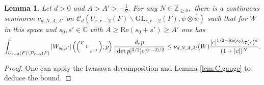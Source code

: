 \documentclass[12pt]{amsart}
\newtheorem{cor}[thm]{Corollary}
\newtheorem{lem}[thm]{Lemma}
\theoremstyle{remark}
\numberwithin{equation}{section}
\newcommand{\GL}{\mathrm{GL}}
\newcommand{\ZZ}{\mathbb{Z}}
\newcommand{\lto}{\longrightarrow}
\newcommand{\CC}{\mathbb{C}}
\newcommand{\quash}[1]{}
\theoremstyle{definition}
\newenvironment{psmatrix}
  {\left(\begin{smallmatrix}}
  {\end{smallmatrix}\right)}
\numberwithin{equation}{subsection}
\begin{document}
\begin{lem} \label{lem:for:zeta}
Let $d>0$ and $A>A'>-\tfrac{1}{2}.$ For any  $N \in \ZZ_{ \geq 0},$ there is a continuous seminorm $\nu_{d,N,A,A'}$ on  
$\mathcal{C}_{d}(U_{r,r-2}(F) \backslash \GL_{r,r-2}(F),\psi \otimes \overline{\psi})
$
such that for $W$ in this space and $s_0,s' \in \CC$ with $A\ge \mathrm{Re}(s_0+s')\ge A'$ one has 
\begin{align*}
    \int_{U_{r-2}(F) \backslash \mathcal{P}_{r-2}(F)}|W_{s_0,s'}|\left(\begin{psmatrix}p & &\\ &  1 & \\ & &c^{-1}\end{psmatrix},p  \right)\frac{d_r p}{|\det p|^{3/2}|c|^{(r-2)/2}} \leq \nu_{d,N,A,A'}(W)\frac{|c|^{1/2-\mathrm{Re}(s_0)}\sigma(c)^{d}}{(1+|c|)^{N}}.
\end{align*}
\end{lem}
\begin{proof}
One can apply the Iwasawa decomposition and Lemma \ref{lem:C:gauge} to deduce the bound.
\end{proof}



 \quash{let
\begin{align} \label{Z:int3}
    &Z(W_{s_0,s'},\chi):=\int_{U_{r-2}(F) \backslash \mathcal{P}_{r-2}(F) \times F^\times} W_{s_0,s'}\left(\begin{psmatrix}p & & \\ &   1 & \\ && c^{-1} \end{psmatrix},p  \right)\frac{d_r p\chi(c)d^\times c}{|\det p|^{\frac{3}{2}}|c|^{(r-2)/2}}
\end{align}
whenever this is absolutely convergent. }
\quash{
By Lemma \ref{lem:for:zeta} we have
\begin{cor}\label{cor:Z:conv}
    If $\mathrm{Re}(\chi)-\mathrm{Re}(s_0) >-\tfrac{1}{2}$ and $\mathrm{Re}(s_0+s') > -\tfrac{1}{2},$ then 
 \eqref{Z:int3}
 converges absolutely for all $W\in \mathcal{C}^w(U_{r,r-2}(F) \backslash \GL_{r,r-2}(F),\psi \otimes \overline{\psi})$
 and the map
\begin{align*}
   Z((\cdot)_{s_0,s'},\chi): \mathcal{C}^w(U_{r,r-2}(F) \backslash \GL_{r,r-2}(F),\psi \otimes \overline{\psi})  &\lto \CC
  \end{align*}
is continuous.\qed
\end{cor}}
\end{document}
